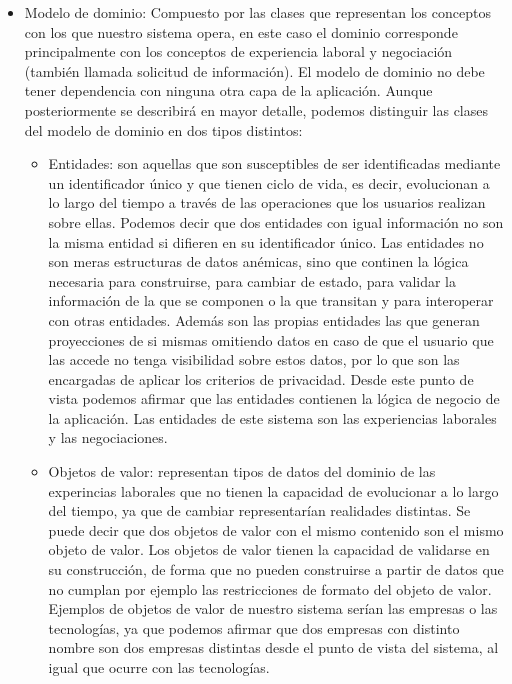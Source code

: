 \documentclass[a4paper, 12pt]{book}
\begin{document}
\begin{itemize}
\item Modelo de dominio: Compuesto por las clases que representan los conceptos con los que nuestro sistema opera, en este caso el dominio corresponde principalmente con los conceptos de experiencia laboral y negociación (también llamada solicitud de información). 
El modelo de dominio no debe tener dependencia con ninguna otra capa de la aplicación.
Aunque posteriormente se describirá en mayor detalle, podemos distinguir las clases del modelo de dominio en dos tipos distintos:

	\begin{itemize}
	 \item Entidades: son aquellas que son susceptibles de ser identificadas mediante un identificador único y que tienen ciclo de vida, es decir, evolucionan a lo largo del tiempo a través de las operaciones que los usuarios realizan sobre ellas. 
	Podemos decir que dos entidades con igual información no son la misma entidad si difieren en su identificador único.
	Las entidades no son meras estructuras de datos anémicas, sino que continen la lógica necesaria para construirse, para cambiar de estado, para validar la información de la que se componen o la que transitan y para interoperar con otras entidades.
	Además son las propias entidades las que generan proyecciones de si mismas omitiendo datos en caso de que el usuario que las accede no tenga visibilidad sobre estos datos, por lo que son las encargadas de aplicar los criterios de privacidad.
	Desde este punto de vista podemos afirmar que las entidades contienen la lógica de negocio de la aplicación.
	Las entidades de este sistema son las experiencias laborales y las negociaciones.

	\item Objetos de valor: representan tipos de datos del dominio de las experincias laborales que no tienen la capacidad de evolucionar a lo largo del tiempo, ya que de cambiar representarían realidades distintas. Se puede decir que dos objetos de valor con el mismo contenido son el mismo objeto de valor.
	Los objetos de valor tienen la capacidad de validarse en su construcción, de forma que no pueden construirse a partir de datos que no cumplan por ejemplo las restricciones de formato del objeto de valor. 
	Ejemplos de objetos de valor de nuestro sistema serían las empresas o las tecnologías, ya que podemos afirmar que dos empresas con distinto nombre son dos empresas distintas desde el punto de vista del sistema, al igual que ocurre con las tecnologías.
	\end{itemize}
  

\end{itemize}
\end{document}
